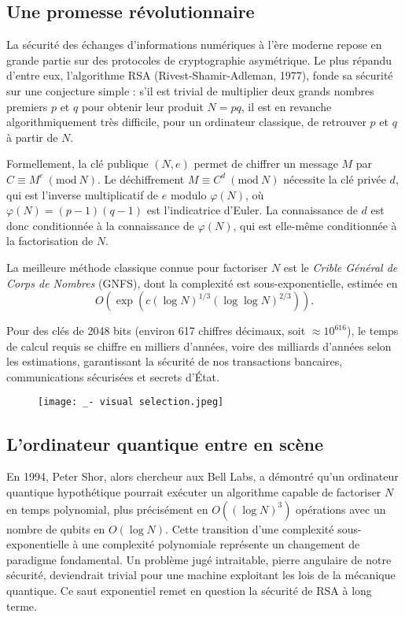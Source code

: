 \documentclass[11pt,a4paper]{article}
\newcommand{\Mod}[1]{\ (\mathrm{mod}\ #1)}
\begin{document}
\subsection{Une promesse révolutionnaire}

La sécurité des échanges d'informations numériques à l'ère moderne repose en grande partie sur des protocoles de cryptographie asymétrique. Le plus répandu d'entre eux, l'algorithme RSA (Rivest-Shamir-Adleman, 1977), fonde sa sécurité sur une conjecture simple : s'il est trivial de multiplier deux grands nombres premiers $p$ et $q$ pour obtenir leur produit $N = pq$, il est en revanche algorithmiquement très difficile, pour un ordinateur classique, de retrouver $p$ et $q$ à partir de $N$.

Formellement, la clé publique $(N, e)$ permet de chiffrer un message $M$ par $C \equiv M^e \Mod{N}$. Le déchiffrement $M \equiv C^d \Mod{N}$ nécessite la clé privée $d$, qui est l'inverse multiplicatif de $e$ modulo $\varphi(N)$, où $\varphi(N) = (p - 1)(q - 1)$ est l'indicatrice d'Euler. La connaissance de $d$ est donc conditionnée à la connaissance de $\varphi(N)$, qui est elle-même conditionnée à la factorisation de $N$.

La meilleure méthode classique connue pour factoriser $N$ est le \textit{Crible Général de Corps de Nombres} (GNFS), dont la complexité est sous-exponentielle, estimée en 
\[O\left(\exp\left(c(\log N)^{1/3}(\log\log N)^{2/3}\right)\right).\]

Pour des clés de 2048 bits (environ 617 chiffres décimaux, soit $\approx 10^{616}$), le temps de calcul requis se chiffre en milliers d'années, voire des milliards d'années selon les estimations, garantissant la sécurité de nos transactions bancaires, communications sécurisées et secrets d'État.

\begin{figure}[h]
    \centering
    \texttt{[image: \_- visual selection.jpeg]}
\end{figure}

\subsection{L'ordinateur quantique entre en scène}

En 1994, Peter Shor, alors chercheur aux Bell Labs, a démontré qu'un ordinateur quantique hypothétique pourrait exécuter un algorithme capable de factoriser $N$ en temps polynomial, plus précisément en $O((\log N)^3)$ opérations avec un nombre de qubits en $O(\log N)$. Cette transition d'une complexité sous-exponentielle à une complexité polynomiale représente un changement de paradigme fondamental. Un problème jugé intraitable, pierre angulaire de notre sécurité, deviendrait trivial pour une machine exploitant les lois de la mécanique quantique. Ce saut exponentiel remet en question la sécurité de RSA à long terme.
\end{document}
